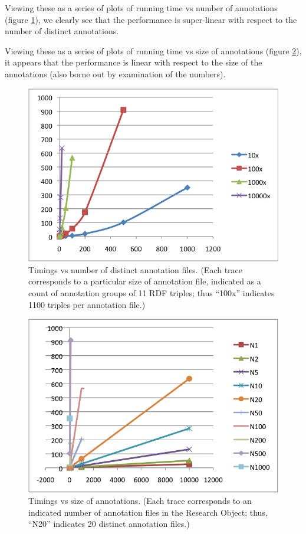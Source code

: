 Viewing these as a series of plots of running time vs number of
annotations (figure \ref{time_per_na}), we clearly see that the
performance is super-linear with respect to the number of distinct
annotations.

Viewing these as a series of plots of running time vs size of
annotations (figure \ref{time_per_sa}), it appears that the performance
is linear with respect to the size of the annotations (also borne out by
examination of the numbers).

\begin{figure}[htbp]
\centering
\includegraphics{figures/benchmark-time-per-NA.png}
\caption{Timings vs number of distinct annotation files. (Each trace
corresponds to a particular size of annotation file, indicated as a
count of annotation groups of 11 RDF triples; thus ``100x'' indicates
1100 triples per annotation file.) \label{time_per_na}}
\end{figure}

\begin{figure}[htbp]
\centering
\includegraphics{figures/benchmark-time-per-SA.png}
\caption{Timings vs size of annotations. (Each trace corresponds to an
indicated number of annotation files in the Research Object; thus,
``N20'' indicates 20 distinct annotation files.) \label{time_per_sa}}
\end{figure}

